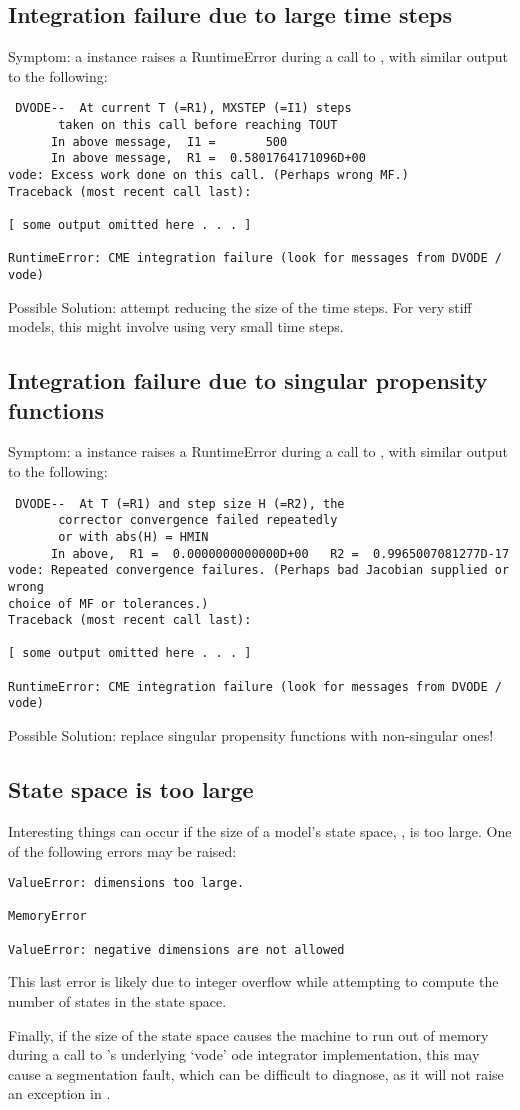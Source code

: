 \subsection{Integration failure due to large time steps}
Symptom: a  instance raises a RuntimeError during a call to
, with similar output to the following:
\begin{verbatim}
 DVODE--  At current T (=R1), MXSTEP (=I1) steps   
       taken on this call before reaching TOUT     
      In above message,  I1 =       500
      In above message,  R1 =  0.5801764171096D+00
vode: Excess work done on this call. (Perhaps wrong MF.)
Traceback (most recent call last):

[ some output omitted here . . . ]

RuntimeError: CME integration failure (look for messages from DVODE / vode)
\end{verbatim}
Possible Solution: attempt reducing the size of the time steps. For very stiff
models, this might involve using very small time steps.

\subsection{Integration failure due to singular propensity functions}
Symptom: a  instance raises a RuntimeError during a call to
, with similar output to the following:
\begin{verbatim}
 DVODE--  At T (=R1) and step size H (=R2), the    
       corrector convergence failed repeatedly     
       or with abs(H) = HMIN   
      In above,  R1 =  0.0000000000000D+00   R2 =  0.9965007081277D-17
vode: Repeated convergence failures. (Perhaps bad Jacobian supplied or wrong
choice of MF or tolerances.)
Traceback (most recent call last):

[ some output omitted here . . . ]

RuntimeError: CME integration failure (look for messages from DVODE / vode)
\end{verbatim}
Possible Solution: replace singular propensity functions with non-singular ones!

\subsection{State space is too large}

Interesting things can occur if the size of a model's state space,
, is too large. One of the following errors may be raised:

\begin{verbatim}
ValueError: dimensions too large.

MemoryError

ValueError: negative dimensions are not allowed
\end{verbatim}
This last error is likely due to integer overflow while attempting to compute
the number of states in the state space.

Finally, if the size of the state space causes the machine to run out of
memory during a call to \scipy{}'s underlying `vode' ode integrator
implementation, this may cause a segmentation fault, which can be difficult to
diagnose, as it will not raise an exception in \python{}.